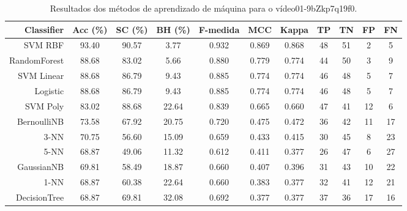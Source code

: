 \begin{table}[!htb]
\centering
\caption{Resultados dos métodos de aprendizado de máquina para o vídeo01-9bZkp7q19f0.}
\label{tab:01-9bZkp7q19f0}
\begin{tabular}{r|c|c|c|c|c|c|c|c|c|c}
\hline\hline
Classifier & Acc (\%) & SC (\%) & BH (\%) & F-medida & MCC & Kappa & TP & TN & FP & FN \\ \hline
SVM RBF & 93.40 & 90.57 & 3.77 & 0.932 & 0.869 & 0.868 & 48 & 51 & 2 & 5 \\ 
RandomForest & 88.68 & 83.02 & 5.66 & 0.880 & 0.779 & 0.774 & 44 & 50 & 3 & 9 \\ 
SVM Linear & 88.68 & 86.79 & 9.43 & 0.885 & 0.774 & 0.774 & 46 & 48 & 5 & 7 \\ 
Logistic & 88.68 & 86.79 & 9.43 & 0.885 & 0.774 & 0.774 & 46 & 48 & 5 & 7 \\ 
SVM Poly & 83.02 & 88.68 & 22.64 & 0.839 & 0.665 & 0.660 & 47 & 41 & 12 & 6 \\ 
BernoulliNB & 73.58 & 67.92 & 20.75 & 0.720 & 0.475 & 0.472 & 36 & 42 & 11 & 17 \\ 
3-NN & 70.75 & 56.60 & 15.09 & 0.659 & 0.433 & 0.415 & 30 & 45 & 8 & 23 \\ 
5-NN & 68.87 & 49.06 & 11.32 & 0.612 & 0.411 & 0.377 & 26 & 47 & 6 & 27 \\ 
GaussianNB & 69.81 & 58.49 & 18.87 & 0.660 & 0.407 & 0.396 & 31 & 43 & 10 & 22 \\ 
1-NN & 68.87 & 60.38 & 22.64 & 0.660 & 0.383 & 0.377 & 32 & 41 & 12 & 21 \\ 
DecisionTree & 68.87 & 69.81 & 32.08 & 0.692 & 0.377 & 0.377 & 37 & 36 & 17 & 16 \\ 
\hline\hline
\end{tabular}
\end{table}
